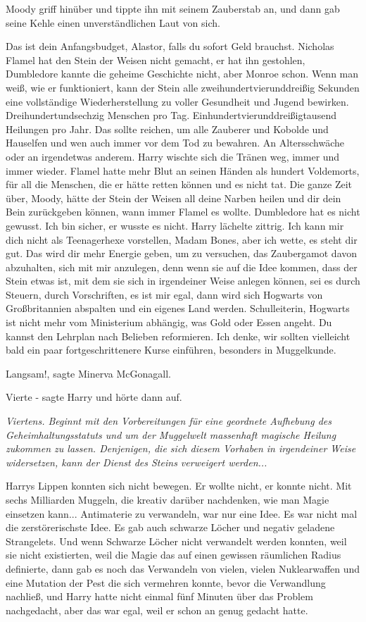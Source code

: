 Moody griff hinüber und tippte ihn mit seinem Zauberstab an, und dann gab seine
Kehle einen unverständlichen Laut von sich.

\glqq{}Das ist dein Anfangsbudget, Alastor, falls du sofort Geld brauchst.
Nicholas Flamel hat den Stein der Weisen nicht gemacht, er hat ihn gestohlen,
Dumbledore kannte die geheime Geschichte nicht, aber Monroe schon. Wenn man
weiß, wie er funktioniert, kann der Stein alle zweihundertvierunddreißig
Sekunden eine vollständige Wiederherstellung zu voller Gesundheit und Jugend
bewirken. Dreihundertundsechzig Menschen pro Tag.
Einhundertvierunddreißigtausend Heilungen pro Jahr. Das sollte reichen, um alle
Zauberer und Kobolde und Hauselfen und wen auch immer vor dem Tod zu bewahren.
An Altersschwäche oder an irgendetwas anderem.\grqq{} Harry wischte sich die Tränen
weg, immer und immer wieder. \glqq{}Flamel hatte mehr Blut an seinen Händen als
hundert Voldemorts, für all die Menschen, die er hätte retten können und es
nicht tat. Die ganze Zeit über, Moody, hätte der Stein der Weisen all deine
Narben heilen und dir dein Bein zurückgeben können, wann immer Flamel es wollte.
Dumbledore hat es nicht gewusst. Ich bin sicher, er wusste es nicht.\grqq{} Harry
lächelte zittrig. \glqq{}Ich kann mir dich nicht als Teenagerhexe vorstellen,
Madam Bones, aber ich wette, es steht dir gut. Das wird dir mehr Energie geben,
um zu versuchen, das Zaubergamot davon abzuhalten, sich mit mir anzulegen, denn
wenn sie auf die Idee kommen, dass der Stein etwas ist, mit dem sie sich in
irgendeiner Weise anlegen können, sei es durch Steuern, durch Vorschriften, es
ist mir egal, dann wird sich Hogwarts von Großbritannien abspalten und ein
eigenes Land werden. Schulleiterin, Hogwarts ist nicht mehr vom Ministerium
abhängig, was Gold oder Essen angeht. Du kannst den Lehrplan nach Belieben
reformieren. Ich denke, wir sollten vielleicht bald ein paar fortgeschrittenere
Kurse einführen, besonders in Muggelkunde.\grqq{}

\glqq{}Langsam!\grqq{}, sagte Minerva McGonagall.

\glqq{}Vierte -\grqq{} sagte Harry und hörte dann auf.

\emph{Viertens. Beginnt mit den Vorbereitungen für eine geordnete Aufhebung des
Geheimhaltungsstatuts und um der Muggelwelt massenhaft magische Heilung zukommen
zu lassen. Denjenigen, die sich diesem Vorhaben in irgendeiner Weise
widersetzen, kann der Dienst des Steins verweigert werden...}

Harrys Lippen konnten sich nicht bewegen. Er wollte nicht, er konnte nicht. Mit
sechs Milliarden Muggeln, die kreativ darüber nachdenken, wie man Magie
einsetzen kann... Antimaterie zu verwandeln, war nur eine Idee. Es war nicht mal
die zerstörerischste Idee. Es gab auch schwarze Löcher und negativ geladene
Strangelets. Und wenn Schwarze Löcher nicht verwandelt werden konnten, weil sie
nicht existierten, weil die Magie das auf einen gewissen räumlichen Radius
definierte, dann gab es noch das Verwandeln von vielen, vielen Nuklearwaffen und
eine Mutation der Pest die sich vermehren konnte, bevor die Verwandlung
nachließ, und Harry hatte nicht einmal fünf Minuten über das Problem
nachgedacht, aber das war egal, weil er schon an genug gedacht hatte.

